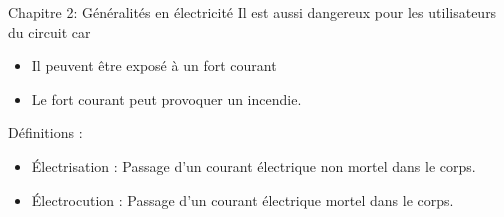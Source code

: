 \documentclass[24pt]{article}
\newcommand{\titre}{Chapitre 2: Généralités en électricité} %
\begin{document}
\begin{titlebox}{\titre}
    Il est aussi dangereux pour les utilisateurs du circuit car 
    
    \begin{itemize}
        \item Il peuvent être exposé à un fort courant 
        \item Le fort courant peut provoquer un incendie.
    \end{itemize}

    \vspace{30pt}

    Définitions : \begin{itemize}
        \item Électrisation : Passage d'un courant électrique non mortel dans le corps.
        \item Électrocution : Passage d'un courant électrique mortel dans le corps.
    \end{itemize}


\end{titlebox}
\end{document}
